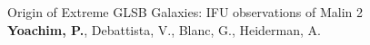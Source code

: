 


{\sc Origin of Extreme GLSB Galaxies:  IFU observations of Malin 2}\\
{\bf Yoachim, P.}, Debattista, V., Blanc, G., Heiderman, A.



